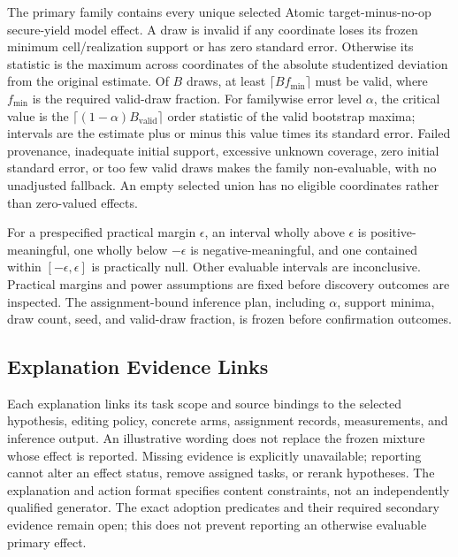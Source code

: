 The primary family contains every unique selected Atomic target-minus-no-op
secure-yield model effect. A draw is invalid if any coordinate loses its frozen
minimum cell/realization support or has zero standard error. Otherwise its
statistic is the maximum across coordinates of the absolute studentized
deviation from the original estimate. Of $B$ draws, at least
$\lceil B f_{\min}\rceil$ must be valid, where $f_{\min}$ is the required
valid-draw fraction. For familywise error level $\alpha$, the critical value is the
$\lceil(1-\alpha)B_{\mathrm{valid}}\rceil$ order statistic of the valid bootstrap
maxima; intervals are the
estimate plus or minus this value times its standard error.
Failed provenance, inadequate initial support, excessive unknown coverage,
zero initial standard error, or too few valid draws makes the family
non-evaluable, with no unadjusted fallback. An empty selected union has no
eligible coordinates rather than zero-valued effects.

For a prespecified practical margin $\epsilon$, an interval wholly above
$\epsilon$ is positive-meaningful, one wholly below $-\epsilon$ is
negative-meaningful, and one contained within $[-\epsilon,\epsilon]$ is
practically null. Other evaluable intervals are inconclusive. Practical margins
and power assumptions are fixed before discovery outcomes are inspected.
The assignment-bound inference plan, including $\alpha$, support minima, draw
count, seed, and valid-draw fraction, is frozen before confirmation outcomes.

\subsection{Explanation Evidence Links}

Each explanation links its task scope and source bindings to the selected
hypothesis, editing policy, concrete arms, assignment records, measurements,
and inference output. An illustrative wording does not replace the frozen
mixture whose effect is reported. Missing evidence is explicitly unavailable;
reporting cannot alter an effect status, remove assigned tasks, or rerank
hypotheses. The explanation and action format specifies content constraints,
not an independently qualified generator. The exact adoption predicates and
their required secondary evidence remain open; this does not prevent reporting
an otherwise evaluable primary effect.
